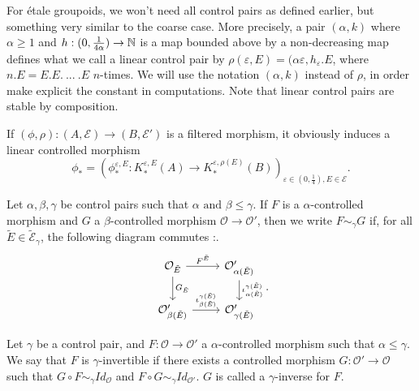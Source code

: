 \begin{rk}\label{LinearCP}
For étale groupoids, we won't need all control pairs as defined earlier, but something very similar to the coarse case. More precisely, a pair $(\alpha,k)$ where $\alpha\geq 1$ and $h : (0,\frac{1}{4\alpha})\rightarrow \mathbb N $ is a map bounded above by a non-decreasing map defines what we call a linear control pair by $\rho(\varepsilon,E)=(\alpha\varepsilon, h_\varepsilon . E$, where $n.E=E.E.\ ...\ .E$ $n$-times. We will use the notation $(\alpha,k)$ instead of $\rho$, in order make explicit the constant in computations. Note that linear control pairs are stable by composition. 
\end{rk}

\begin{rk}
If $(\phi,\rho) : (A,\mathcal E)\rightarrow (B,\mathcal E')$ is a filtered morphism, it obviously induces a linear controlled morphism 
\[\phi_* = \left(\phi_*^{\varepsilon,E} : K_*^{\varepsilon,E}(A)\rightarrow K_*^{\varepsilon,\rho(E)}(B) \right)_{\varepsilon\in (0,\frac{1}{4}),E\in\mathcal E}.\] 
\end{rk}

Let $\alpha,\beta,\gamma$ be control pairs such that $\alpha \text{ and }\beta\leq \gamma$. If $F$ is a $\alpha$-controlled morphism and $G$ a $\beta$-controlled morphism $\mathcal O\rightarrow \mathcal O'$, then we write $F\sim_\gamma G$ if, for all $\tilde E\in \mathcal{\tilde E}_\gamma$, the following diagram commutes :.\[\begin{tikzcd}
\mathcal O_{\tilde E} \arrow{r}{F^{\tilde E}}\arrow{d}{G_{\tilde E}} & \mathcal O'_{\alpha(\tilde E)} \arrow{d}{\iota_{\alpha(\tilde E)}^{\gamma(\tilde E)}} \\
\mathcal O'_{\beta(\tilde E)}\arrow{r}{\iota_{\beta(\tilde E)}^{\gamma(\tilde E)}} & \mathcal O'_{\gamma(\tilde E)}
\end{tikzcd}.\]

\begin{definition}Let $\gamma$ be a control pair, and $F: \mathcal O\rightarrow \mathcal O'$ a $\alpha$-controlled morphism such that $\alpha \leq \gamma$. We say that $F$ is $\gamma$-invertible if there exists a controlled morphism $G: \mathcal O'\rightarrow \mathcal O$ such that $G\circ F \sim_\gamma Id_{\mathcal O}$ and $F\circ G \sim_\gamma Id_{\mathcal O'}$. $G$ is called a $\gamma$-inverse for $F$. \end{definition}


